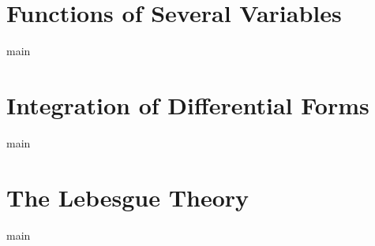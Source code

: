 \chapter{Functions of Several Variables}\label{chap:09-functions-of-several-variables}
{main}

\chapter{Integration of Differential Forms}\label{chap:10-integration-of-differential-forms}
{main}

\chapter{The Lebesgue Theory}\label{chap:11-the-lebesgue-theory}
{main}
